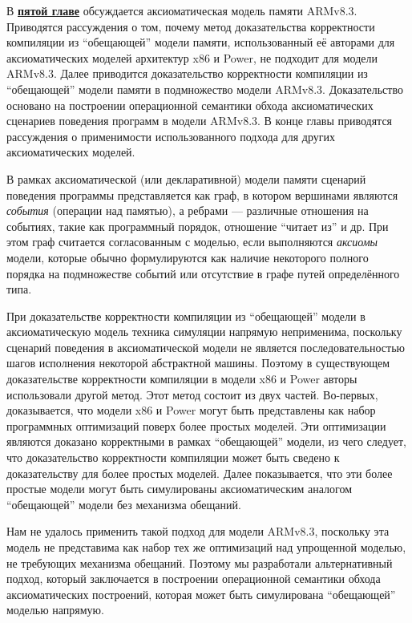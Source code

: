 В \underline{\textbf{пятой главе}} обсуждается аксиоматическая модель памяти ARMv8.3.
Приводятся рассуждения о том, почему метод доказательства корректности компиляции из
``обещающей'' модели памяти, использованный её авторами для аксиоматических моделей архитектур x86 и Power,
не подходит для модели ARMv8.3. Далее приводится доказательство корректности компиляции из ``обещающей'' модели
памяти в подмножество модели ARMv8.3. Доказательство основано на построении операционной семантики обхода аксиоматических сценариев
поведения программ в модели ARMv8.3. В конце главы приводятся рассуждения о применимости использованного подхода для других
аксиоматических моделей.

В рамках аксиоматической (или декларативной) модели памяти сценарий поведения программы представляется как граф, в котором вершинами
являются \emph{события} (операции над памятью), а ребрами --- различные отношения на событиях, такие как программный
порядок, отношение ``читает из'' и др. При этом граф считается согласованным с моделью, если выполняются \emph{аксиомы} модели,
которые обычно формулируются как наличие некоторого полного порядка на подмножестве событий или отсутствие  в графе путей определённого
типа.

При доказательстве корректности компиляции из ``обещающей'' модели в аксиоматическую модель техника симуляции напрямую
неприменима, поскольку сценарий поведения в аксиоматической модели не является последовательностью шагов исполнения некоторой абстрактной машины.
Поэтому в существующем доказательстве корректности компиляции в 
модели x86 и Power авторы использовали другой метод. Этот метод состоит из двух частей.
Во-первых, доказывается, что модели x86 и Power могут быть представлены как набор программных оптимизаций поверх
более простых моделей. Эти оптимизации являются доказано корректными в рамках ``обещающей'' модели, из чего следует,
что доказательство корректности компиляции может быть сведено к доказательству для более простых моделей.
Далее показывается, что эти более простые модели могут быть симулированы аксиоматическим аналогом
``обещающей'' модели без механизма обещаний.

Нам не удалось применить такой подход для модели ARMv8.3, поскольку эта модель не представима как набор тех же
оптимизаций над упрощенной моделью, не требующих механизма обещаний. Поэтому мы разработали альтернативный подход,
который заключается в построении операционной семантики обхода аксиоматических построений, которая может быть
симулирована ``обещающей'' моделью напрямую.

